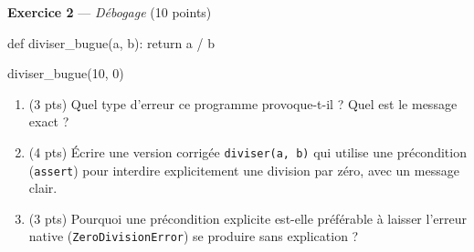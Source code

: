 \bigskip

\textbf{Exercice 2} --- \textit{Débogage} \hfill (10 points)

\begin{python}
def diviser_bugue(a, b):
    return a / b

diviser_bugue(10, 0)
\end{python}

\begin{enumerate}
  \item (3 pts) Quel type d'erreur ce programme provoque-t-il ? Quel est le message exact ?
  \item (4 pts) Écrire une version corrigée \lstinline{diviser(a, b)} qui utilise une précondition (\lstinline{assert}) pour interdire explicitement une division par zéro, avec un message clair.
  \item {\raggedright (3 pts) Pourquoi une précondition explicite est-elle préférable à laisser l'erreur native (\lstinline{ZeroDivisionError}) se produire sans explication ?\par}
\end{enumerate}

